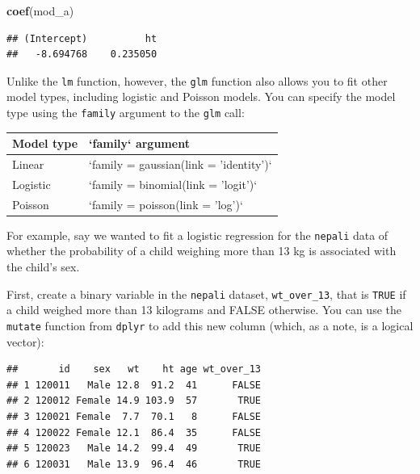 \documentclass[]{book}
\makeatletter
\newenvironment{Shaded}{\begin{snugshade}}{\end{snugshade}}
\newcommand{\KeywordTok}[1]{\textcolor[rgb]{0.13,0.29,0.53}{\textbf{{#1}}}}
\newcommand{\DataTypeTok}[1]{\textcolor[rgb]{0.13,0.29,0.53}{{#1}}}
\newcommand{\DecValTok}[1]{\textcolor[rgb]{0.00,0.00,0.81}{{#1}}}
\newcommand{\StringTok}[1]{\textcolor[rgb]{0.31,0.60,0.02}{{#1}}}
\newcommand{\NormalTok}[1]{{#1}}
\newenvironment{kframe}{%
\medskip{}
\setlength{\fboxsep}{.8em}
 \def\at@end@of@kframe{}%
 \ifinner\ifhmode%
  \def\at@end@of@kframe{\end{minipage}}%
  \begin{minipage}{\columnwidth}%
 \fi\fi%
 \def\FrameCommand##1{\hskip\@totalleftmargin \hskip-\fboxsep
 \colorbox{shadecolor}{##1}\hskip-\fboxsep
     \hskip-\linewidth \hskip-\@totalleftmargin \hskip\columnwidth}%
 \MakeFramed {\advance\hsize-\width
   \@totalleftmargin\z@ \linewidth\hsize
   \@setminipage}}%
 {\par\unskip\endMakeFramed%
 \at@end@of@kframe}
\renewenvironment{Shaded}{\begin{kframe}}{\end{kframe}}
\makeatother
\begin{document}
\begin{Shaded}
\begin{Highlighting}[]
\KeywordTok{coef}\NormalTok{(mod_a)}
\end{Highlighting}
\end{Shaded}

\begin{verbatim}
## (Intercept)          ht 
##   -8.694768    0.235050
\end{verbatim}

Unlike the \texttt{lm} function, however, the \texttt{glm} function also
allows you to fit other model types, including logistic and Poisson
models. You can specify the model type using the \texttt{family}
argument to the \texttt{glm} call:

\begin{tabular}{l|l}
\hline
Model type & `family` argument\\
\hline
Linear & `family = gaussian(link = 'identity')`\\
\hline
Logistic & `family = binomial(link = 'logit')`\\
\hline
Poisson & `family = poisson(link = 'log')`\\
\hline
\end{tabular}

For example, say we wanted to fit a logistic regression for the
\texttt{nepali} data of whether the probability of a child weighing more
than 13 kg is associated with the child's sex.

First, create a binary variable in the \texttt{nepali} dataset,
\texttt{wt\_over\_13}, that is \texttt{TRUE} if a child weighed more
than 13 kilograms and FALSE otherwise. You can use the \texttt{mutate}
function from \texttt{dplyr} to add this new column (which, as a note,
is a logical vector):

\begin{Shaded}
\end{Shaded}

\begin{verbatim}
##       id    sex   wt    ht age wt_over_13
## 1 120011   Male 12.8  91.2  41      FALSE
## 2 120012 Female 14.9 103.9  57       TRUE
## 3 120021 Female  7.7  70.1   8      FALSE
## 4 120022 Female 12.1  86.4  35      FALSE
## 5 120023   Male 14.2  99.4  49       TRUE
## 6 120031   Male 13.9  96.4  46       TRUE
\end{verbatim}
\end{document}
